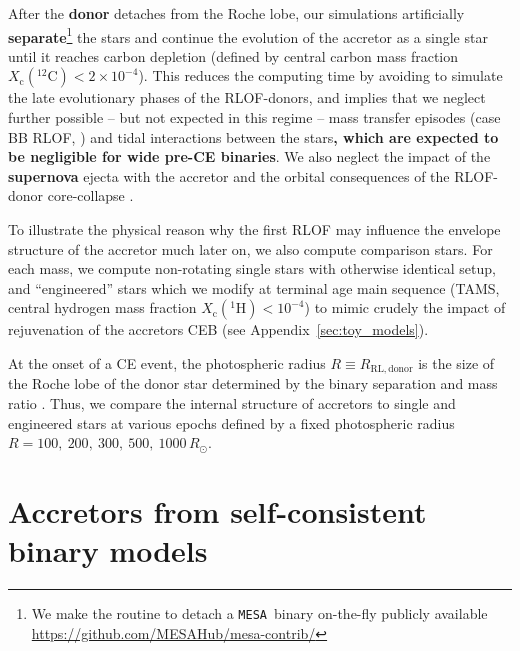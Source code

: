 \documentclass[twocolumn,twocolappendix,trackchanges]{aastex63}
\newcommand{\code}[1]{\texttt{#1}}
\newcommand{\mesa}{\code{MESA}}
\begin{document}
After the \textcolor{green!80!black}{\bf donor} detaches from the Roche lobe, our
simulations artificially \textcolor{green!80!black}{\bf separate}\footnote{We make
  the routine to detach a \mesa\ binary on-the-fly publicly available
  \url{https://github.com/MESAHub/mesa-contrib/}} the stars and
continue the evolution of the accretor as a single star until it
reaches carbon depletion (defined by central carbon mass fraction
$X_\mathrm{c}(^{12}\mathrm{C})<2\times10^{-4} $). This reduces the
computing time by avoiding to simulate the late evolutionary phases of
the RLOF-donors, and implies that we neglect further possible -- but
not expected in this regime -- mass transfer episodes (case BB RLOF,
\citealt{delgado:81, laplace:2020}) and tidal interactions between the
stars\textcolor{green!80!black}{\bf , which are expected to be negligible for wide
  pre-CE binaries}. We also neglect the impact of the \textcolor{green!80!black}{\bf supernova}
ejecta with the accretor \cite[\textcolor{green!80!black}{\bf which has a small and
  short-lasting effect only on the outermost layers},
e.g.,][]{hirai:2018, ogata:2021} and the orbital consequences of the
RLOF-donor core-collapse \citep[e.g.,][]{brandt:1995, kalogera:1996,
  tauris:1998, renzo:2019walk}.

To illustrate the physical reason why the first RLOF may influence the
envelope structure of the accretor much later on, we also compute
comparison stars. For each mass, we compute non-rotating single stars
with otherwise identical setup, and ``engineered'' stars which we
modify at terminal age main sequence (TAMS, central hydrogen mass
fraction $X_\mathrm{c}(^1\mathrm{H})<10^{-4}$) to mimic crudely the
impact of rejuvenation of the accretors CEB (see
Appendix~\ref{sec:toy_models}).

At the onset of a CE event, the photospheric radius
$R\equiv R_\mathrm{RL, donor}$ is the size of the Roche lobe of the
donor star determined by the binary separation and mass ratio
\citep[e.g.,][]{paczynski:1971, eggleton:83}. Thus, we compare the
internal structure of accretors to single and engineered stars at
various epochs defined by a fixed photospheric radius
$R=100,\ 200,\ 300,\ 500,\ 1000\,R_\odot$.

\section{Accretors from self-consistent binary models}
\label{sec:bin_models}
\end{document}
